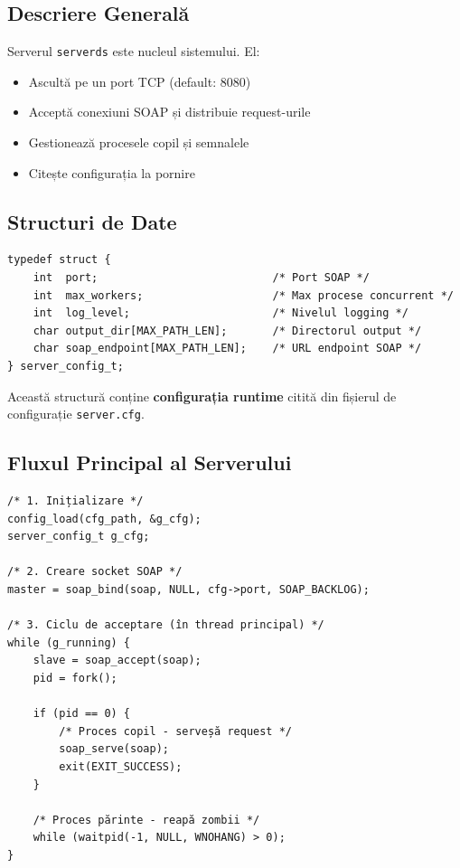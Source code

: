 \documentclass[12pt,a4paper,oneside]{book}
\begin{document}
\subsection{Descriere Generală}

Serverul \texttt{serverds} este nucleul sistemului. El:
\begin{itemize}
    \item Ascultă pe un port TCP (default: 8080)
    \item Acceptă conexiuni SOAP și distribuie request-urile
    \item Gestionează procesele copil și semnalele
    \item Citește configurația la pornire
\end{itemize}

\subsection{Structuri de Date}

\begin{lstlisting}
typedef struct {
    int  port;                           /* Port SOAP */
    int  max_workers;                    /* Max procese concurrent */
    int  log_level;                      /* Nivelul logging */
    char output_dir[MAX_PATH_LEN];       /* Directorul output */
    char soap_endpoint[MAX_PATH_LEN];    /* URL endpoint SOAP */
} server_config_t;
\end{lstlisting}

Această structură conține \textbf{configurația runtime} citită din fișierul de configurație \texttt{server.cfg}.

\subsection{Fluxul Principal al Serverului}

\begin{lstlisting}[caption=Fluxul principal de execuție]
/* 1. Inițializare */
config_load(cfg_path, &g_cfg);
server_config_t g_cfg;

/* 2. Creare socket SOAP */
master = soap_bind(soap, NULL, cfg->port, SOAP_BACKLOG);

/* 3. Ciclu de acceptare (în thread principal) */
while (g_running) {
    slave = soap_accept(soap);
    pid = fork();
    
    if (pid == 0) {
        /* Proces copil - serveșă request */
        soap_serve(soap);
        exit(EXIT_SUCCESS);
    }
    
    /* Proces părinte - reapă zombii */
    while (waitpid(-1, NULL, WNOHANG) > 0);
}
\end{lstlisting}
\end{document}
